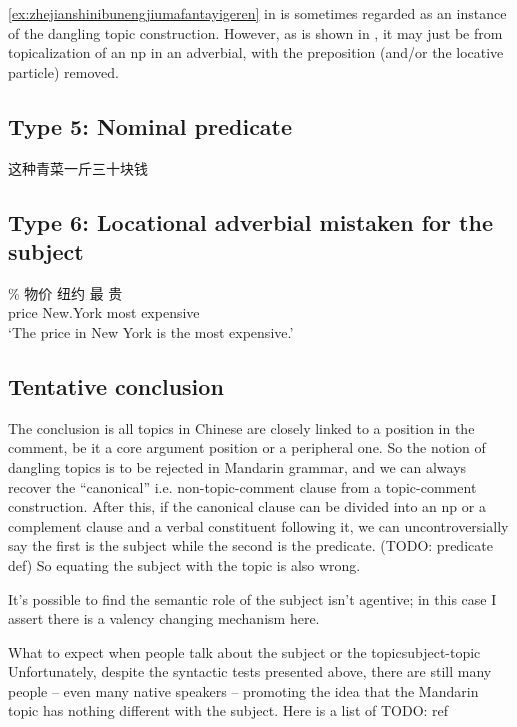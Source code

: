 \documentclass[UTF8, a4paper, oneside, scheme=plain, 12pt]{ctexrep}
\newcommand{\translate}[1]{`#1'}
\begin{document}
\eqref{ex:zhejianshinibunengjiumafantayigeren} in  
is sometimes regarded as an instance of the dangling topic construction.
However, as is shown in ,
it may just be from topicalization of an \acs{np} in an adverbial,
with the preposition (and/or the locative particle) removed.

\subsection{Type 5: Nominal predicate}

\begin{exe}
    \ex 这种青菜一斤三十块钱
\end{exe}

\subsection{Type 6: Locational adverbial mistaken for the subject}

\begin{exe}
    \ex \gll \% 物价 纽约 最 贵  \\
    {} price New.York most expensive \\
    \glt \translate{The price in New York is the most expensive.}
\end{exe}

\subsection{Tentative conclusion}

The conclusion is all topics in Chinese are closely linked to a position in the comment,
be it a core argument position or a peripheral one.
So the notion of dangling topics is to be rejected in Mandarin grammar,
and we can always recover the ``canonical'' i.e. non-topic-comment clause
from a topic-comment construction.
After this, if the canonical clause can be divided into an \acs{np}
or a complement clause and a verbal constituent following it,
we can uncontroversially say the first is the subject while the second is the predicate. (TODO: predicate def)
So equating the subject with the topic is also wrong.

It's possible to find the semantic role of the subject isn't agentive;
in this case I assert there is a valency changing mechanism here.

\begin{infobox}{What to expect when people talk about the subject or the topic}{subject-topic}
    Unfortunately, despite the syntactic tests presented above,
    there are still many people -- even many native speakers -- 
    promoting the idea that the Mandarin topic has nothing different with the subject.
    Here is a list of TODO: ref
\end{infobox}

\printbibliography
\end{document}

